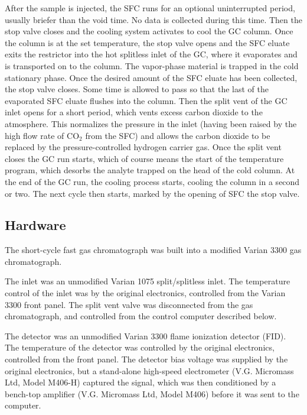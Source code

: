 \documentclass[aip,rsi,preprint,graphicx]{revtex4-1} %
\begin{document}
After the sample is injected, the SFC runs for an optional uninterrupted period,
usually briefer than the void time. No data is collected during this time. Then
the stop valve closes and the cooling system activates to cool the GC column.
Once the column is at the set temperature, the stop valve opens and the SFC
eluate exits the restrictor into the hot splitless inlet of the GC, where it
evaporates and is transported on to the column. The vapor-phase material
is trapped in the cold stationary phase. Once the desired amount
of the SFC eluate has been collected, the stop valve closes. Some time is
allowed to pass so that the last of the evaporated SFC eluate flushes into the
column. Then the split vent of the GC inlet opens for a short period, which
vents excess carbon dioxide to the atmosphere. This normalizes the pressure in
the inlet (having been raised  by the high flow rate of CO$_2$ from the SFC) and
allows the carbon dioxide to be replaced by the pressure-controlled hydrogen
carrier gas. Once the split vent closes the GC run starts, which of course means
the start of the temperature program, which desorbs the analyte trapped on the
head of the cold column. At the end of the GC run, the cooling process starts,
cooling the column in a second or two. The next cycle then starts, marked by the
opening of SFC the stop valve.

\subsection{Hardware}
The short-cycle fast gas chromatograph was built into a modified
Varian\texttrademark{} 3300 gas chromatograph.

The inlet was an unmodified Varian\texttrademark{} 1075 split/splitless inlet.
The temperature control of the inlet was by the original electronics, controlled
from the Varian 3300 front panel. The split vent valve was disconnected from the
gas chromatograph, and controlled from the control computer described below.

The detector was an unmodified Varian\texttrademark{} 3300 flame ionization
detector (FID). The temperature of the detector was controlled by the original
electronics, controlled from the front panel. The detector bias voltage was
supplied by the original electronics, but a stand-alone high-speed electrometer
(V.G. Micromass Ltd, Model M406-H) captured the signal, which was then
conditioned by a bench-top amplifier (V.G. Micromass Ltd, Model M406) before it
was sent to the computer.
\end{document}

